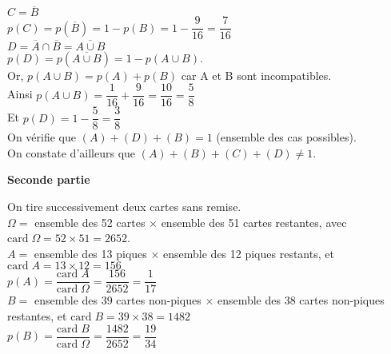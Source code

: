 $ C = \overline{B} $ \\

$ p\left(C\right) = p\left(\overline{B} \right) = 1 - p\left(B\right) = 1 - \dfrac{9}{16} = \dfrac{7}{16} $ \\

$ D = \overline{A} \cap \overline{B} = \overline{A \cup B} $ \\

$ p\left(D\right) = p\left(\overline{A\cup B}\right) = 1 - p\left(A\cup B\right)$.  \\

Or, $p\left(A\cup B\right) = p\left(A\right) + p\left(B\right) $ car A et B sont incompatibles. \\

Ainsi $p\left(A\cup B\right) = \dfrac{1}{16} + \dfrac{9}{16} = \dfrac{10}{16} = \dfrac{5}{8} $ \\

Et $p\left(D\right) = 1 - \dfrac{5}{8} = \dfrac{3}{8} $ \\

On vérifie que $\left(A\right) + \left(D\right) + \left(B\right) = 1$ (ensemble des cas possibles). \\ On constate d'ailleurs que $\left(A\right) + \left(B\right) + \left(C\right) + \left(D\right) \neq 1 $.

\newpage

\textbf{Seconde partie}

On tire successivement deux cartes sans remise. \\

$\Omega =$  ensemble des 52 cartes $ \times $ ensemble des 51 cartes restantes, avec $\mathrm{card} \; \Omega = 52 \times 51 = 2652 $. \\

$ A = $ ensemble des 13 piques $ \times $ ensemble des 12 piques restants, et $\mathrm{card} \; A = 13 \times 12 = 156 $ \\

$ p\left(A\right) = \dfrac{\mathrm{card} \; A}{\mathrm{card} \; \Omega} = \dfrac{156}{2652} = \dfrac{1}{17} $ \\

$ B = $ ensemble des 39 cartes non-piques $ \times $ ensemble des 38 cartes non-piques restantes, et $\mathrm{card} \; B = 39 \times 38 = 1482 $ \\

$ p\left(B\right) = \dfrac{\mathrm{card} \; B}{\mathrm{card} \; \Omega} = \dfrac{1482}{2652} = \dfrac{19}{34} $ \\

